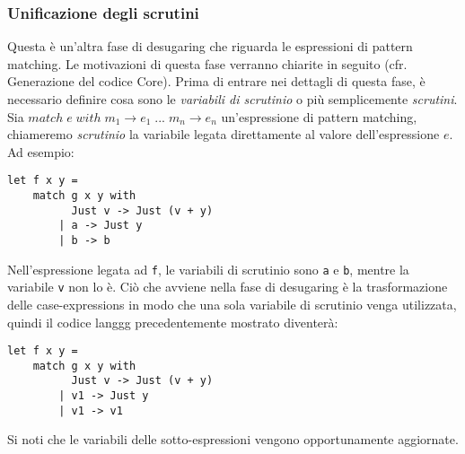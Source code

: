 \documentclass[10pt,a4paper]{article}
\begin{document}
\subsubsection{Unificazione degli scrutini}
Questa è un'altra fase di desugaring che riguarda le espressioni di pattern matching. Le motivazioni di questa
fase verranno chiarite in seguito (cfr. Generazione del codice Core). Prima di entrare nei dettagli di questa fase,
è necessario definire cosa sono le \textit{variabili di scrutinio} o più semplicemente \textit{scrutini}. Sia
$ match \; e \; with \; m_1 \rightarrow e_1 \; ... \; m_n \rightarrow e_n $ un'espressione di pattern matching,
chiameremo \textit{scrutinio} la variabile legata direttamente al valore dell'espressione $ e $. Ad esempio:
\begin{lstlisting}
let f x y =
    match g x y with
          Just v -> Just (v + y)
        | a -> Just y
        | b -> b
\end{lstlisting}
Nell'espressione legata ad \texttt{f}, le variabili di scrutinio sono \texttt{a} e \texttt{b}, mentre la variabile
\texttt{v} non lo è. Ciò che avviene nella fase di desugaring è la trasformazione delle case-expressions in modo che
una sola variabile di scrutinio venga utilizzata, quindi il codice langgg precedentemente mostrato diventerà:
\begin{lstlisting}
let f x y =
    match g x y with
          Just v -> Just (v + y)
        | v1 -> Just y
        | v1 -> v1
\end{lstlisting}
Si noti che le variabili delle sotto-espressioni vengono opportunamente aggiornate.
\end{document}
